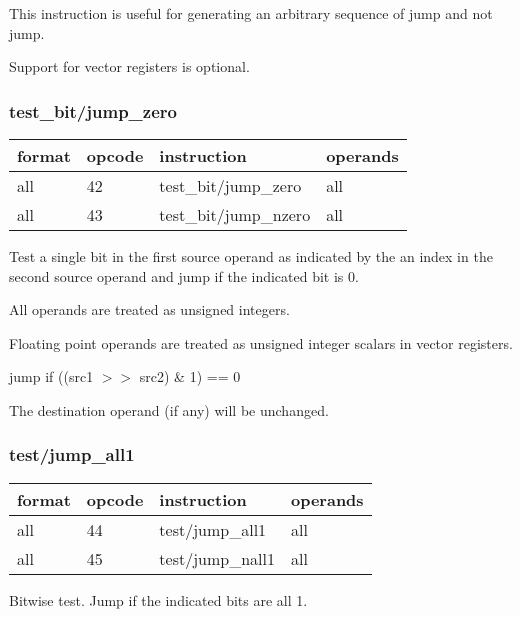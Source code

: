 \documentclass[forwardcom.tex]{subfiles}
\begin{document}
This instruction is useful for generating an arbitrary sequence of jump and not jump.
\vspace{2mm}

Support for vector registers is optional.


\subsubsection{test\_bit/jump\_zero}
\label{table:testBitJumpZeroInstruction}
\begin{tabular}{|p{16mm}|p{12mm}|p{60mm}|p{50mm}|}
\hline
\bfseries format & \bfseries opcode & \bfseries instruction & \bfseries operands \\ \hline
all & 42 & test\_bit/jump\_zero & all \\ \hline
all & 43 & test\_bit/jump\_nzero & all \\ \hline
\end{tabular}
\vspace{2mm}

Test a single bit in the first source operand as indicated by the an index in the second source operand and jump if the indicated bit is 0. 
\vspace{2mm}

All operands are treated as unsigned integers. 

Floating point operands are treated as unsigned integer scalars in vector registers.
\vspace{2mm}

jump if ((src1 $>>$ src2) \& 1) == 0
\vspace{2mm}

The destination operand (if any) will be unchanged.

\subsubsection{test/jump\_all1}
\label{table:testJumpAll1Instruction}
\begin{tabular}{|p{16mm}|p{12mm}|p{60mm}|p{50mm}|}
\hline
\bfseries format & \bfseries opcode & \bfseries instruction & \bfseries operands \\ \hline
all & 44 & test/jump\_all1 & all \\ \hline
all & 45 & test/jump\_nall1 & all \\ \hline
\end{tabular}
\vspace{2mm}

Bitwise test. Jump if the indicated bits are all 1.
\vspace{2mm}
\end{document}
